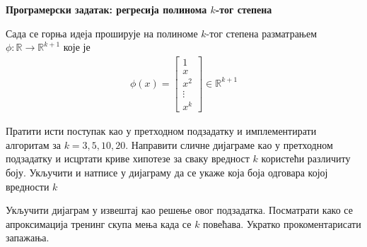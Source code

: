 \item{} {\bf Програмерски задатак: регресија полинома $k$-тог степена}

Сада се горња идеја проширује на полиноме $k$-тог степена разматрањем $\phi:\mathbb{R}\rightarrow \mathbb{R}^{k+1}$ које је
\begin{align}
\phi(x) = \left[\begin{array}{c} 1\\ x \\ x^2\\ \vdots \\x^k \end{array}\right]\in \mathbb{R}^{k+1} \label{eqn:feature-k}
\end{align}

Пратити исти поступак као у претходном подзадатку и имплементирати алгоритам за $k=3,5,10,20$. Направити сличне дијаграме као у претходном подзадатку и исцртати криве хипотезе за сваку вредност $k$ користећи различиту боју. Укључити и натписе у дијаграму да се укаже која боја одговара којој вредности $k$

Укључити дијаграм у извештај као решење овог подзадатка. Посматрати како се апроксимација тренинг скупа мења када се $k$ повећава. Укратко прокоментарисати запажања.


